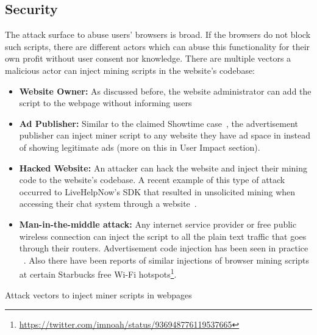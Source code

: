 \subsection{\textbf{Security}}
The attack surface to abuse users' browsers is broad. If the browsers do not block such scripts, there are different actors which can abuse this functionality for their own profit without user consent nor knowledge. There are multiple vectors a malicious actor can inject mining scripts in the website's codebase:
\begin{itemize}
\item \textbf{Website Owner:} As discussed before, the website administrator can add the script to the webpage without informing users
\item \textbf{Ad Publisher:} Similar to the claimed Showtime case~\cite{showtimehive}, the advertisement publisher can inject miner script to any website they have ad space in instead of showing legitimate ads (more on this in User Impact section).
\item \textbf{Hacked Website:} An attacker can hack the website and inject their mining code to the website's codebase. A recent example of this type of attack occurred to LiveHelpNow's SDK that resulted in unsolicited mining when accessing their chat system through a website~\cite{chatsupporthack}.
\item \textbf{Man-in-the-middle attack:} Any internet service provider or free public wireless connection can inject the script to all the plain text traffic that goes through their routers. Advertisement code injection has been seen in practice ~\cite{vergeadinjection}. Also there have been reports of similar injections of browser mining scripts at certain Starbucks free Wi-Fi hotspots\footnote{\url{https://twitter.com/imnoah/status/936948776119537665}}.
\end{itemize}

\vspace*{-5mm}
\begin{center}
	\caption{Attack vectors to inject miner scripts in webpages}
\end{center}
\vspace*{-2mm}

